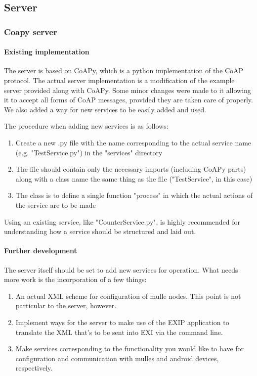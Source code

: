 \subsection{Server}
\subsubsection{Coapy server}
\paragraph{Existing implementation}
The server is based on CoAPy, which is a python implementation of the CoAP protocol. The actual server implementation is a modification of the example server provided along with CoAPy.
Some minor changes were made to it allowing it to accept all forms of CoAP messages, provided they are taken care of properly. We also added a way for new services to be easily added 
and used. 

The procedure when adding new services is as follows:
\begin{enumerate}
\item Create a new .py file with the name corresponding to the actual service name (e.g. "TestService.py") in the "services" directory
\item The file should contain only the necessary imports (including CoAPy parts) along with a class name the same thing as the file ("TestService", in this case)
\item The class is to define a single function "process" in which the actual actions of the service are to be made
\end{enumerate}

Using an existing service, like "CounterService.py", is highly recommended for understanding how a service should be structured and laid out.

\paragraph{Further development}
The server itself should be set to add new services for operation. What needs more work is the incorporation of a few things:

\begin{enumerate}
\item An actual XML scheme for configuration of mulle nodes. This point is not particular to the server, however.
\item Implement ways for the server to make use of the EXIP application to translate the XML that's to be sent into EXI via the command line.
\item Make services corresponding to the functionality you would like to have for configuration and communication with mulles and android devices, respectively.
\end{enumerate}
